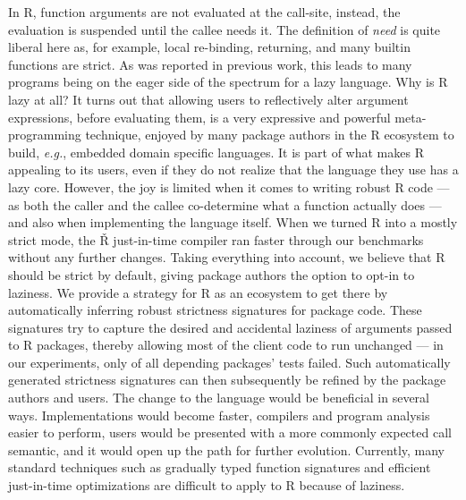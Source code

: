 \documentclass[review,creen,acmsmall]{acmart}
\renewcommand{\Rsh}{{\sf\v R}\xspace}
\newcommand{\eg}{\emph{e.g.},\xspace}
\begin{document}
In R, function arguments are not evaluated at the call-site, instead, the
evaluation is suspended until the callee needs it. The definition of
\emph{need} is quite liberal here as, for example, local re-binding, returning,
and many builtin functions are strict. As was reported in previous work, this
leads to many programs being on the eager side of the spectrum for a lazy
language. Why is R lazy at all? It turns out that allowing users to reflectively
alter argument expressions, before evaluating them, is a very expressive and
powerful meta-programming technique, enjoyed by many package authors in the R
ecosystem to build, \eg embedded domain specific languages. It is part of
what makes R appealing to its users, even if they do not realize that the
language they use has a lazy core. However, the joy is limited when it comes to
writing robust R code --- as both the caller and the callee co-determine what a function
actually does --- and also when implementing the language itself. When we turned
R into a mostly strict mode, the \Rsh just-in-time compiler ran
\speedupRshStrict faster through our benchmarks without any further changes.
Taking everything into account, we believe that R should be strict by default,
giving package authors the option to opt-in to laziness. We provide a strategy
for R as an ecosystem to get there by automatically inferring robust strictness
signatures for package code. These signatures try to capture the desired and
accidental laziness of arguments passed to R packages, thereby allowing most of
the client code to run unchanged --- in our experiments, only \robustnesResult of
all depending packages' tests failed. Such automatically generated strictness
signatures can then subsequently be refined by the package authors and users.
The change to the language would be beneficial in several ways. Implementations
would become faster, compilers and program analysis easier to perform, users
would be presented with a more commonly expected call semantic, and it would open
up the path for further evolution. Currently, many standard techniques such as
gradually typed function signatures and efficient just-in-time optimizations are
difficult to apply to R because of laziness.




\appendix
\end{document}
